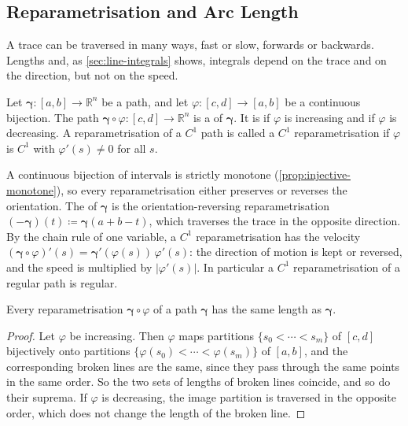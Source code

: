 \subsection{Reparametrisation and Arc Length}

A trace can be traversed in many ways, fast or slow, forwards or backwards. Lengths and, as \cref{sec:line-integrals} shows, integrals depend on the trace and on the direction, but not on the speed.

\begin{definition}[Reparametrisation]
\label{def:reparametrisation}
Let $\boldsymbol\gamma\colon[a,b]\to\mathbb R^n$ be a path, and let $\varphi\colon[c,d]\to[a,b]$ be a continuous bijection. The path $\boldsymbol\gamma\circ\varphi\colon[c,d]\to\mathbb R^n$ is a  of $\boldsymbol\gamma$. It is  if $\varphi$ is increasing and  if $\varphi$ is decreasing. A reparametrisation of a $C^1$ path is called a $C^1$ reparametrisation if $\varphi$ is $C^1$ with $\varphi'(s)\ne0$ for all $s$.
\end{definition}

A continuous bijection of intervals is strictly monotone (\cref{prop:injective-monotone}), so every reparametrisation either preserves or reverses the orientation. The  of $\boldsymbol\gamma$ is the orientation-reversing reparametrisation $(-\boldsymbol\gamma)(t)\coloneqq\boldsymbol\gamma(a+b-t)$, which traverses the trace in the opposite direction. By the chain rule of one variable, a $C^1$ reparametrisation has the velocity $(\boldsymbol\gamma\circ\varphi)'(s)=\boldsymbol\gamma'(\varphi(s))\,\varphi'(s)$: the direction of motion is kept or reversed, and the speed is multiplied by $|\varphi'(s)|$. In particular a $C^1$ reparametrisation of a regular path is regular.

\begin{proposition}
\label{prop:length-invariant}
Every reparametrisation $\boldsymbol\gamma\circ\varphi$ of a path $\boldsymbol\gamma$ has the same length as $\boldsymbol\gamma$.
\end{proposition}

\begin{proof}
Let $\varphi$ be increasing. Then $\varphi$ maps partitions $\{s_0<\cdots<s_m\}$ of $[c,d]$ bijectively onto partitions $\{\varphi(s_0)<\cdots<\varphi(s_m)\}$ of $[a,b]$, and the corresponding broken lines are the same, since they pass through the same points in the same order. So the two sets of lengths of broken lines coincide, and so do their suprema. If $\varphi$ is decreasing, the image partition is traversed in the opposite order, which does not change the length of the broken line.
\end{proof}

